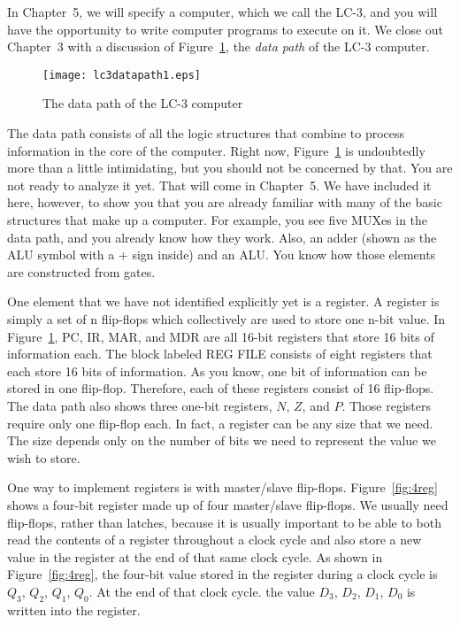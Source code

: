\documentclass{patt}
\begin{document}
In Chapter~5, we will specify a computer, which we call the LC-3, and
you will have the opportunity to write computer programs to execute on
it.  We close out Chapter~3 with a discussion of Figure~\ref{fig:lc3datapath1},
the {\em data path} of the LC-3 computer.

\begin{figure}
\begin{minipage}{36pc}
\centerline{\texttt{[image: lc3datapath1.eps]}}
\caption{The data path of the LC-3 computer}
\label{fig:lc3datapath1}
\end{minipage}
\vspace{24pt}
\end{figure}

\FloatBarrier

The data path
 consists of all the logic structures that
combine to process information in the core of the computer.  Right
now, Figure~\ref{fig:lc3datapath1} is undoubtedly more than a little 
intimidating, but
you should not be concerned by that.  You are not ready to analyze it
yet.  That will come in Chapter~5.  We have included it here, however,
to show you that you are already familiar with many of the basic
structures that make up a computer.  For example, you see five MUXes in 
the data path, and you already know how they work.  Also, an adder (shown
as the ALU symbol with a + sign inside) and an ALU.  You know how those 
elements are constructed from gates.  

One element that we have not identified explicitly yet is a register. 
A register is simply a set of n flip-flops which collectively are used to
store one n-bit value.
In Figure~\ref{fig:lc3datapath1}, PC, IR, MAR, and MDR are all 16-bit registers 
that store 16 bits of information each.  The block labeled REG FILE consists
of eight registers that each store 16 bits of information.  As you know, 
one bit of information can be stored in one flip-flop.  Therefore, each of 
these registers consist of 16 flip-flops.  The data path also shows three
one-bit registers, $N$, $Z$, and $P$.  Those registers require only one 
flip-flop each.  In fact, a register can be any size that we need.  The size 
depends only on the number of bits we need to represent the value we wish to
store.  

One way to implement registers is with master/slave flip-flops.
Figure~\ref{fig:4reg} shows a four-bit register made up of four master/slave
flip-flops.  We usually need flip-flops, rather than latches, because it is 
usually important 
to be able to both read the contents of a register throughout a clock cycle 
and also store a new value in the register at the end of that same clock 
cycle.  As shown in Figure~\ref{fig:4reg}, the four-bit value stored in the 
register during a clock cycle is $Q_3$, $Q_2$, $Q_1$, $Q_0$.  At the 
end of that clock cycle.  the value $D_3$, $D_2$, $D_1$, $D_0$ is written into 
the register. 
\end{document}
